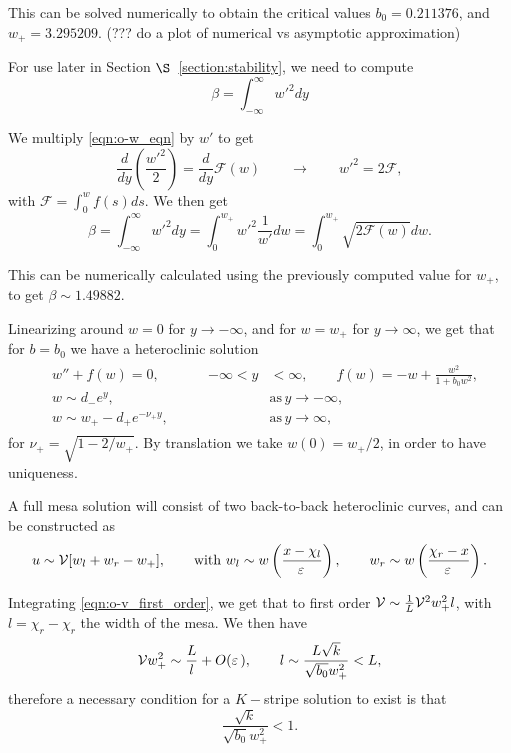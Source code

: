 This can be solved numerically to obtain the critical values $b_0 = 0.211376$, and $w_+ = 3.295209$. (??? do a plot of numerical vs asymptotic approximation)

For use later in Section $\S$~\eqref{section:stability}, we need to compute
% 
$$
\beta = \int_{-\infty}^{\infty}w'^2dy
$$
% 

We multiply \eqref{eqn:o-w_eqn} by $w'$ to get 
% 
\begin{equation*}
  \frac{d}{dy}\left(\frac{w'^2}{2} \right)=\frac{d}{dy}\mathcal{F}(w)\qquad\rightarrow\qquad w'^2 = 2\mathcal{F},
\end{equation*}
% 
with $\mathcal{F} = \int_0^wf(s)ds$. We then get
% 
\begin{equation}
\label{eqn:o-beta}
  \beta = \int_{-\infty}^{\infty}w'^2dy = \int_{0}^{w_+}w'^2\frac{1}{w'} dw = \int_{0}^{w_+}\sqrt{2\mathcal{F}(w)}dw.
\end{equation}
% 

This can be numerically calculated using the previously computed value for $w_+$, to get $\beta\sim1.49882$.

Linearizing around $w=0$ for $y\rightarrow -\infty$, and for $w=w_+$ for $y\rightarrow \infty$, we get that for $b=b_0$ we have a heteroclinic solution 
% 
\begin{equation*}
\begin{split}
\begin{aligned}
  &w''+f(w)=0,\qquad &-\infty<y&<\infty,\qquad f(w) = -w + \frac{w^2}{1+b_0w^2},\\
  &w\sim d_-e^y,\qquad &&\mathrm{as}\hspace{2pt}y\rightarrow -\infty,\\
  &w\sim w_+ - d_+e^{-\nu_+y},\qquad&&\mathrm{as}\hspace{2pt}y\rightarrow \infty,
\end{aligned}
\end{split}
\end{equation*}
% 
for $\nu_+ = \sqrt{1-2/w_+}$. By translation we take $w(0)=w_+/2$, in order to have uniqueness.

A full mesa solution will consist of two back-to-back heteroclinic curves, and can be constructed as
% 
\begin{equation*}
  u\sim \mathcal{V}[w_l + w_r - w_+],\qquad  \textrm{with }w_l\sim w\left(\frac{x-\chi_l}{\varepsilon\,}\right),\qquad w_r\sim w\left(\frac{\chi_r-x}{\varepsilon\,}\right).
\end{equation*}
% 

Integrating \eqref{eqn:o-v_first_order}, we get that to first order $\mathcal{V}\sim\frac{1}{L}\mathcal{V}^2w_+^2l$, with $l=\chi_r-\chi_r$ the width of the mesa. We then have
% 
\begin{equation*}
  \mathcal{V} w_+^2\sim\frac{L}{l} + O(\varepsilon\,),\qquad l\sim\frac{L\sqrt{k}}{\sqrt{b_0}w_+^2}<L,
\end{equation*}
% 
therefore a necessary condition for a $K-$stripe solution to exist is that 
% 
\begin{equation*}
  \frac{\sqrt{k}}{\sqrt{b_0}w_+^2}<1.
\end{equation*}
% 

